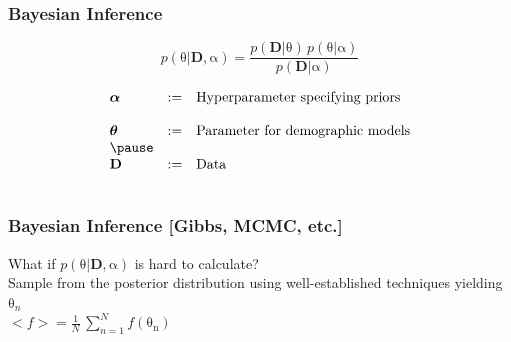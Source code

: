 \documentclass{beamer}
\newcommand{\greekbf}[1]{\boldsymbol{\mathrm{#1}}}
\begin{document}
\begin{frame}
  \frametitle{Bayesian Inference}
  \begin{center}
	\begin{equation*}
          p(\greekbf{\theta}|\mathbf{D},\greekbf{\alpha}) = \frac{p(\mathbf{D}|\greekbf{\theta}) \, p(\greekbf{\theta}|\greekbf{\alpha})}{p(\mathbf{D}|\greekbf{\alpha})}
        \end{equation*}
  \end{center}

  \pause
  \begin{center}
          \begin{equation*}
            \begin{array}{lll}
	      \greekbf{\alpha} & := & \mbox{Hyperparameter specifying priors}\\
                               &    &\\
              \greekbf{\theta} & := & \mbox{Parameter for demographic models}\\
	      \pause
                               &    &\\
              \mathbf{D}       & := & \mbox{Data}\\
                               &    &\\
            \end{array}
          \end{equation*}
  \end{center}
\end{frame}

\begin{frame}
  \frametitle{Bayesian Inference [Gibbs, MCMC, etc.]}
  \Large
  What if $p(\greekbf{\theta}|\mathbf{D},\greekbf{\alpha})$ is hard to calculate?\\
  \pause
  \vspace{.75cm}
  Sample from the posterior distribution using well-established techniques yielding $\greekbf{\theta}_n$\\
  \pause
  \vspace{.75cm}
  $<f> = \frac{1}{N} \, \sum_{n=1}^{N} f(\greekbf{\theta_n})$\\
\end{frame}
\end{document}

